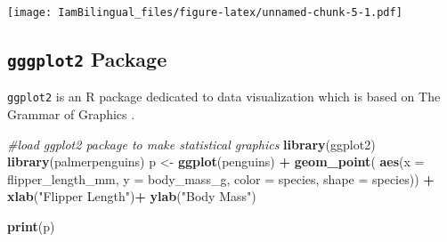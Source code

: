 \documentclass[]{book}
\newenvironment{Shaded}{\begin{snugshade}}{\end{snugshade}}
\newcommand{\CommentTok}[1]{\textcolor[rgb]{0.56,0.35,0.01}{\textit{#1}}}
\newcommand{\DataTypeTok}[1]{\textcolor[rgb]{0.13,0.29,0.53}{#1}}
\newcommand{\DecValTok}[1]{\textcolor[rgb]{0.00,0.00,0.81}{#1}}
\newcommand{\KeywordTok}[1]{\textcolor[rgb]{0.13,0.29,0.53}{\textbf{#1}}}
\newcommand{\NormalTok}[1]{#1}
\newcommand{\OperatorTok}[1]{\textcolor[rgb]{0.81,0.36,0.00}{\textbf{#1}}}
\newcommand{\StringTok}[1]{\textcolor[rgb]{0.31,0.60,0.02}{#1}}
\begin{document}
\begin{Shaded}
\end{Shaded}

\texttt{[image: IamBilingual\_files/figure-latex/unnamed-chunk-5-1.pdf]}

\hypertarget{gggplot2-package}{%
\subsection{\texorpdfstring{\texttt{gggplot2} Package}{gggplot2 Package}}\label{gggplot2-package}}

\texttt{ggplot2} is an R package dedicated to data visualization which is based on The Grammar of Graphics \citep{wilkinson2012grammar}.

\begin{Shaded}
\begin{Highlighting}[]
\CommentTok{#load ggplot2 package to make statistical graphics}
\KeywordTok{library}\NormalTok{(ggplot2)}
\KeywordTok{library}\NormalTok{(palmerpenguins)}
\NormalTok{p <-}\StringTok{ }\KeywordTok{ggplot}\NormalTok{(penguins) }\OperatorTok{+}
\StringTok{  }\KeywordTok{geom_point}\NormalTok{( }\KeywordTok{aes}\NormalTok{(}\DataTypeTok{x =}\NormalTok{ flipper_length_mm,}
                  \DataTypeTok{y =}\NormalTok{ body_mass_g,}
                  \DataTypeTok{color =}\NormalTok{ species,}
                  \DataTypeTok{shape =}\NormalTok{ species)) }\OperatorTok{+}
\StringTok{  }\KeywordTok{xlab}\NormalTok{(}\StringTok{"Flipper Length"}\NormalTok{)}\OperatorTok{+}
\StringTok{  }\KeywordTok{ylab}\NormalTok{(}\StringTok{"Body Mass"}\NormalTok{)}

\KeywordTok{print}\NormalTok{(p)}
\end{Highlighting}
\end{Shaded}
\end{document}
